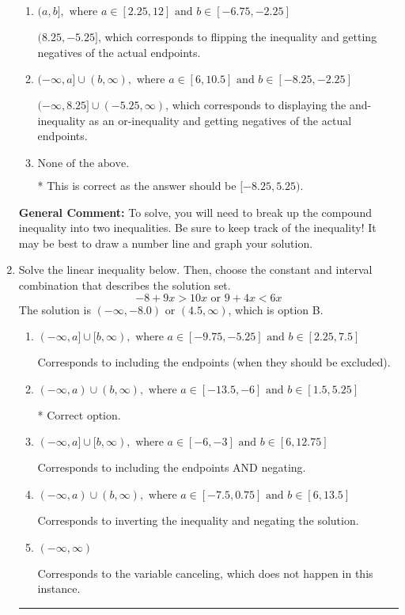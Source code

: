 \documentclass{extbook}[14pt]
\newcommand{\litem}[1]{\item #1

\rule{\textwidth}{0.4pt}}
\begin{document}
\begin{enumerate}
{\begin{enumerate}[label=\Alph*.]
$[8.25, -5.25)$, which is the correct interval but negatives of the actual endpoints.
\item \( (a, b], \text{ where } a \in [2.25, 12] \text{ and } b \in [-6.75, -2.25] \)

$(8.25, -5.25]$, which corresponds to flipping the inequality and getting negatives of the actual endpoints.
\item \( (-\infty, a] \cup (b, \infty), \text{ where } a \in [6, 10.5] \text{ and } b \in [-8.25, -2.25] \)

$(-\infty, 8.25] \cup (-5.25, \infty)$, which corresponds to displaying the and-inequality as an or-inequality and getting negatives of the actual endpoints.
\item \( \text{None of the above.} \)

* This is correct as the answer should be $[-8.25, 5.25)$.
\end{enumerate}

\textbf{General Comment:} To solve, you will need to break up the compound inequality into two inequalities. Be sure to keep track of the inequality! It may be best to draw a number line and graph your solution.
}
\litem{
Solve the linear inequality below. Then, choose the constant and interval combination that describes the solution set.
\[ -8 + 9 x > 10 x \text{ or } 9 + 4 x < 6 x \]The solution is \( (-\infty, -8.0) \text{ or } (4.5, \infty) \), which is option B.\begin{enumerate}[label=\Alph*.]
\item \( (-\infty, a] \cup [b, \infty), \text{ where } a \in [-9.75, -5.25] \text{ and } b \in [2.25, 7.5] \)

Corresponds to including the endpoints (when they should be excluded).
\item \( (-\infty, a) \cup (b, \infty), \text{ where } a \in [-13.5, -6] \text{ and } b \in [1.5, 5.25] \)

 * Correct option.
\item \( (-\infty, a] \cup [b, \infty), \text{ where } a \in [-6, -3] \text{ and } b \in [6, 12.75] \)

Corresponds to including the endpoints AND negating.
\item \( (-\infty, a) \cup (b, \infty), \text{ where } a \in [-7.5, 0.75] \text{ and } b \in [6, 13.5] \)

Corresponds to inverting the inequality and negating the solution.
\item \( (-\infty, \infty) \)

Corresponds to the variable canceling, which does not happen in this instance.
\end{enumerate}

}
\end{enumerate}
\end{document}
